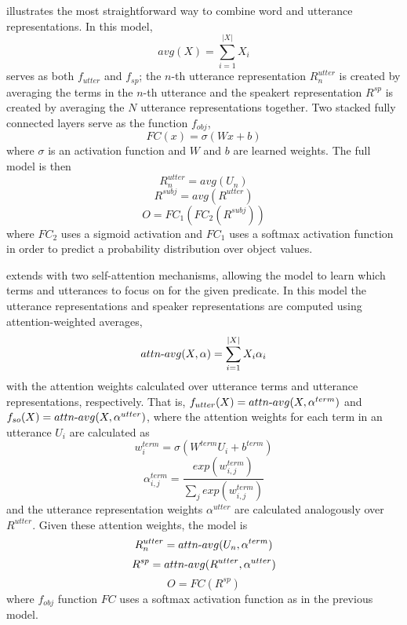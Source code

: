  illustrates the most straightforward way to combine word and utterance representations.
In this model,
\begin{equation}
avg(X) = \sum_{i=1}^{|X|} X_i
\end{equation}
serves as both $f_{utter} $ and $f_{sp}$; the $n$-th utterance representation $R^{utter}_n$ is created by averaging the terms in the $n$-th utterance and the speakert representation $R^{sp}$ is created by averaging the $N$ utterance representations together. Two stacked fully connected layers serve as the function $f_{obj}$,
\begin{equation}
FC(x) = \sigma(Wx+b)
\end{equation}
where $\sigma$ is an activation function and $W$ and $b$ are learned weights.
The full  model is then
\begin{equation}
R^{utter}_n = avg(U_n)
\end{equation}
\begin{equation}
R^{subj} = avg(R^{utter})
\end{equation}
\begin{equation}
O = FC_1(FC_2(R^{subj}))
\end{equation}
where $FC_2$ uses a sigmoid activation and $FC_1$ uses a softmax activation function in order to predict a probability distribution over object values.

 extends  with two self-attention mechanisms, allowing the model to learn which terms and utterances to focus on for the given predicate. In this model the utterance representations and speaker representations are computed using attention-weighted averages,
\begin{equation}
attn{\text -}avg(X, \alpha) = \sum_{i=1}^{|X|} X_i \alpha_i
\end{equation}
with the attention weights calculated over utterance terms and utterance representations, respectively.
That is, $f_{utter}(X)=attn{\text -}avg(X, \alpha^{term})$ and $f_{so}(X)=attn{\text -}avg(X, \alpha^{utter})$, where
the attention weights for each term in an utterance $U_i$ are calculated as
\begin{equation} \label{eq:attn1}
w^{term}_i = \sigma(W^{term} U_i + b^{term})
\end{equation}
\begin{equation} \label{eq:attn2}
\alpha^{term}_{i,j} = \frac{exp(w^{term}_{i,j})}{\sum_j exp(w^{term}_{i,j})}
\end{equation}
and the utterance representation weights $\alpha^{utter}$ are calculated analogously over $R^{utter}$.
Given these attention weights, the  model is
\begin{equation}
R^{utter}_n = attn{\text -}avg(U_n, \alpha^{term})
\end{equation}
\begin{equation}
R^{sp} = attn{\text -}avg(R^{utter}, \alpha^{utter})
\end{equation}
\begin{equation}
O = FC(R^{sp})
\end{equation}
where $f_{obj}$ function $FC$ uses a softmax activation function as in the previous model.

